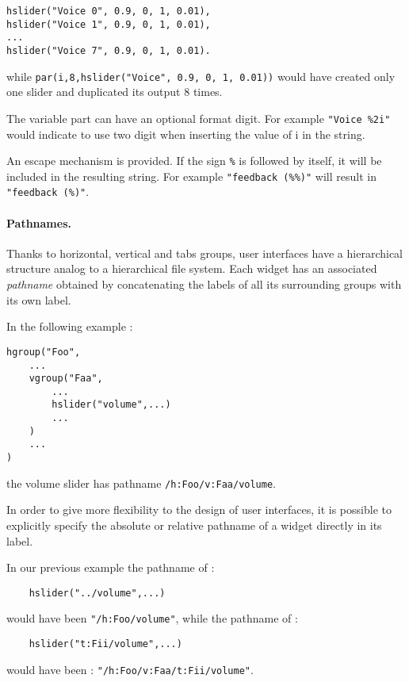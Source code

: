\begin{lstlisting}
hslider("Voice 0", 0.9, 0, 1, 0.01),
hslider("Voice 1", 0.9, 0, 1, 0.01),
...
hslider("Voice 7", 0.9, 0, 1, 0.01).
\end{lstlisting}

while \lstinline'par(i,8,hslider("Voice", 0.9, 0, 1, 0.01))' would have created only one slider and duplicated its output 8 times.

The variable part can have an optional format digit. 
For example \lstinline'"Voice %2i"' would indicate to use two digit when inserting the value of i in the string.

An escape mechanism is provided.
If the sign \lstinline'%' is followed by itself, it will be included in the resulting string.
For example \lstinline'"feedback (%%)"' will result in \lstinline'"feedback (%)"'.

\paragraph{Pathnames.}
Thanks to horizontal, vertical and tabs groups, user interfaces have a hierarchical structure analog to a hierarchical file system. Each widget has an associated \textit{pathname} obtained by concatenating the labels of all its surrounding groups with its own label.

In the following example :
\begin{lstlisting}
hgroup("Foo",
	...
	vgroup("Faa", 
		...
		hslider("volume",...)
		...
	)
	...
)
\end{lstlisting}
the volume slider has pathname \lstinline'/h:Foo/v:Faa/volume'.

In order to give more flexibility to the design of user interfaces, it is possible to explicitly specify the absolute or relative pathname of a widget directly in its label. 

In our previous example the pathname of :
\begin{lstlisting}
	hslider("../volume",...)
\end{lstlisting}
would have been \lstinline'"/h:Foo/volume"', while the pathname of :
\begin{lstlisting}
	hslider("t:Fii/volume",...)
\end{lstlisting}
would have been : 
\lstinline'"/h:Foo/v:Faa/t:Fii/volume"'.

